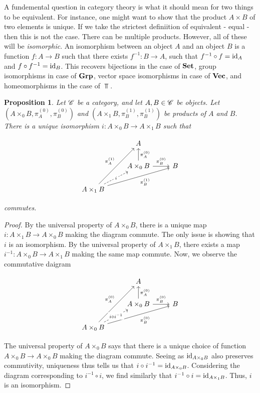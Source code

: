 \documentclass{article}
\newtheorem{proposition}{Proposition}[section]
\theoremstyle{definition}
\numberwithin{figure}{section}
\begin{document}
A fundemental question in category theory is what it should mean for two things to be equivalent. For instance, one might want to show that the product $A\times B$ of two elements is unique. If we take the strictest definiition of equivalent - equal - then this is not the case. There can be multiple products. However, all of these will be \textit{isomorphic}. An isomorphism between an object $A$ and an object $B$ is a function $f:A\to B$ such that there exists $f^{-1}:B\to A$, such that $f^{-1}\circ f=\mathrm{id}_{A}$ and $f\circ f^{-1}=\mathrm{id}_B$. This recovers bijections in the case of $\bold{Set}$, group isomorphisms in case of $\bold{Grp}$, vector space isomorphisms in case of $\bold{Vec}$, and homeomorphisms in the case of $\Top$.

\begin{proposition} Let $\mathscr{C}$ be a category, and let $A,B\in \mathscr{C}$ be objects. Let $(A\times_0 B,\pi_A^{(0)},\pi_B^{(0)})$ and $(A\times_1 B,\pi_B^{(1)},\pi_B^{(1)})$ be products of $A$ and $B$. There is a unique isomorphism $i:A\times_0 B\to A\times_1 B$ such that

\[\begin{tikzcd}
	& A \\
	& {A\times_0 B} & B \\
	{A\times _1 B}
	\arrow["{\pi_A^{(0)}}"', from=2-2, to=1-2]
	\arrow["{\pi_B^{(0)}}", from=2-2, to=2-3]
	\arrow["i"{description}, dashed, from=3-1, to=2-2]
	\arrow["{\pi_A^{(1)}}", from=3-1, to=1-2]
	\arrow["{\pi_B^{(1)}}"', from=3-1, to=2-3]
\end{tikzcd}\]

commutes.
\end{proposition}
\begin{proof} By the universal property of $A\times_0 B$, there is a unique map $i: A\times_1 B\to A\times _0 B$ making the diagram commute. The only issue is showing that $i$ is an isomorphism. By the universal property of $A\times _1 B$, there exists a map $i^{-1}:A\times_0 B\to A\times_1 B$ making the same map commute. Now, we observe the commutative daigram

\[\begin{tikzcd}
	& A \\
	& {A\times_0 B} & B \\
	{A\times_0 B}
	\arrow["{\pi_A^{(0)}}"', from=2-2, to=1-2]
	\arrow["{\pi_B^{(0)}}", from=2-2, to=2-3]
	\arrow["{\pi_A^{(0)}}", from=3-1, to=1-2]
	\arrow["{\pi_B^{(0)}}"', from=3-1, to=2-3]
	\arrow["{i\circ i^{-1}}"{description}, dashed, from=3-1, to=2-2]
\end{tikzcd}\]

The universal property of $A\times_0 B$ says that there is a unique choice of function $A\times_0B\to A\times_0 B$ making the diagram commute. Seeing as $\mathrm{id}_{A\times_0 B}$ also preserves commutivity, uniqueness thus tells us that $i\circ i^{-1}=\mathrm{id}_{A\times_0 B}$. Considering the diagram corresponding to $i^{-1}\circ i$, we find similarly that $i^{-1}\circ i=\mathrm{id}_{A\times_1 B}$. Thus, $i$ is an isomorphism.
\end{proof}
\end{document}

